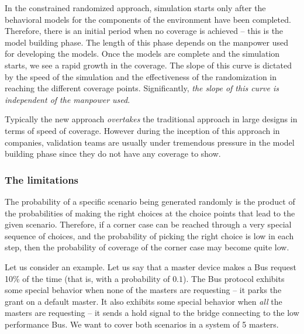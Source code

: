 \noindent
In the constrained randomized approach, simulation starts only after the
behavioral models for the components of the environment have been completed.
Therefore, there is an initial period when no coverage is achieved -- this 
is the model building phase. The length of this phase depends on the manpower
used for developing the models. Once the models are complete and the simulation
starts, we see a rapid growth in the coverage. The slope of this curve
is dictated by the speed of the simulation and the effectiveness of the
randomization in reaching the different coverage points. Significantly,
{\em the slope of this curve is independent of the manpower used}.

\noindent
Typically the new approach {\em overtakes} the traditional approach in large
designs in terms of speed of coverage. However during the inception of this
approach in companies, validation teams are usually under tremendous
pressure in the model building phase since they do not have any coverage
to show.

\subsubsection{The limitations} 
The probability of a specific scenario being generated randomly 
is the product of the
probabilities of making the right choices at the choice points that lead to
the given scenario. Therefore, if a corner case can be reached through a
very special sequence of choices, and the probability of picking the right
choice is low in each step, then the probability of coverage of the corner
case may become quite low.

\noindent
Let us consider an example. Let us say that a master device makes a Bus request
10\% of the time (that is, with a probability of $0.1$). The Bus protocol
exhibits some special behavior when none of the masters are requesting --
it parks the grant on a default master. It also exhibits some special
behavior when {\em all} the masters are requesting -- it sends a hold signal
to the bridge connecting to the low performance Bus. We want to cover both
scenarios in a system of 5 masters.

